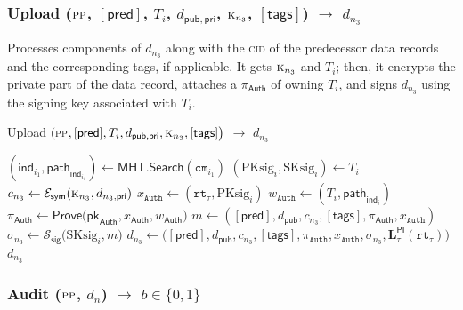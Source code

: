 \subsubsection{\textsf{Upload} ($\textsc{pp}$, $[\textsf{pred}]$, $T_i$, $d_{\mathsf{pub}, \mathsf{pri}}$, $\textsc{k}_{n_3}$, $[\textsf{tags}]$) $\rightarrow$ $d_{n_3}$}

Processes components of $d_{n_3}$ along with the \textsc{cid} of the predecessor data records and the corresponding tags, if applicable. It gets $\textsc{k}_{n_3}$ and $T_i$; then, it encrypts the private part of the data record, attaches a $\pi_\textsf{Auth}$ of owning $T_i$, and signs $d_{n_3}$ using the signing key associated with $T_i$.

\begin{algorithm}
\caption{\textsf{Upload} $\big($\textsc{pp}$, [\textsf{pred}], T_i, d_{\mathsf{pub}, \mathsf{pri}}, \textsc{k}_{n_3}, [\textsf{tags}]  \big)$ $\rightarrow$ $d_{n_3}$}\label{alg:Upload}
\begin{algorithmic}[1]
\State $(\mathsf{ind}_{i_1}, \mathsf{path}_{\mathsf{ind}_{i_1}}) \gets \mathsf{MHT}.\mathsf{Search}(\texttt{cm}_{i_1})$
\State $(\text{PKsig}_{i}, \text{SKsig}_{i}) \gets T_i$
\State $c_{n_3} \gets \mathcal{E}_\mathsf{sym}(\textsc{k}_{n_3}, d_{{n_3}, \mathsf{pri}} )$
\State $x_\texttt{Auth} \gets (\texttt{rt}_\tau, \text{PKsig}_{i})$
\State $w_\texttt{Auth} \gets (T_i, \mathsf{path}_{\mathsf{ind}_{i}})$
\State $\pi_{\textsf{Auth}} \gets \textsf{Prove}\big(\mathsf{pk}_{\textsf{Auth}}, x_{\textsf{Auth}}, w_{\textsf{Auth}}\big)$
\State $m \gets ([\textsf{pred}], d_{\mathsf{pub}}, c_{n_3}, [\textsf{tags}], \pi_{\textsf{Auth}}, x_\texttt{Auth})$
\State $\sigma_{n_3} \gets \mathcal{S}_\mathsf{sig}\big(\text{SKsig}_{i}, m \big)$
\State $d_{n_3} \gets \big([\textsf{pred}],  d_{\mathsf{pub}}, c_{n_3},
        [\textsf{tags}], \pi_\texttt{Auth}, x_\texttt{Auth}, \sigma_{n_3}, \mathbf{L}_\tau^\mathsf{PI}(\texttt{rt}_\tau)\big)$
\State \Return $d_{n_3}$
\end{algorithmic}
\end{algorithm}


\newpage

\subsubsection{\textsf{Audit} ($\textsc{pp}$, $d_n$) $\rightarrow$ $b \in \{0, 1\}$}

